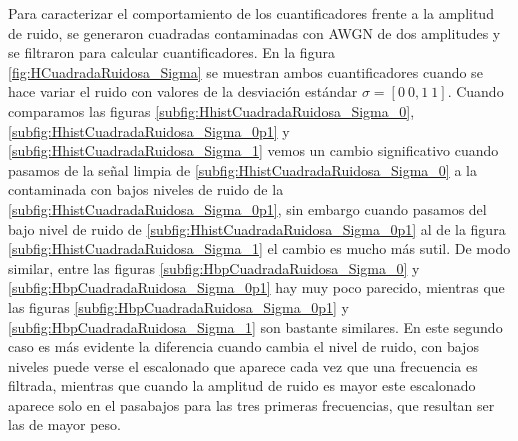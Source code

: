 Para caracterizar el comportamiento de los cuantificadores frente a la amplitud de ruido, se generaron cuadradas contaminadas con AWGN de dos amplitudes y se filtraron para calcular cuantificadores.
En la figura \ref{fig:HCuadradaRuidosa_Sigma} se muestran ambos cuantificadores cuando se hace variar el ruido con valores de la desviación estándar $\sigma=[0~0,1~1]$.
Cuando comparamos las figuras \ref{subfig:HhistCuadradaRuidosa_Sigma_0}, \ref{subfig:HhistCuadradaRuidosa_Sigma_0p1} y \ref{subfig:HhistCuadradaRuidosa_Sigma_1} vemos un cambio significativo cuando pasamos de la señal limpia de \ref{subfig:HhistCuadradaRuidosa_Sigma_0} a la contaminada con bajos niveles de ruido de la \ref{subfig:HhistCuadradaRuidosa_Sigma_0p1}, sin embargo cuando pasamos del bajo nivel de ruido de \ref{subfig:HhistCuadradaRuidosa_Sigma_0p1} al de la figura \ref{subfig:HhistCuadradaRuidosa_Sigma_1} el cambio es mucho más sutil.
De modo similar, entre las figuras \ref{subfig:HbpCuadradaRuidosa_Sigma_0} y \ref{subfig:HbpCuadradaRuidosa_Sigma_0p1} hay muy poco parecido, mientras que las figuras \ref{subfig:HbpCuadradaRuidosa_Sigma_0p1} y \ref{subfig:HbpCuadradaRuidosa_Sigma_1} son bastante similares.
En este segundo caso es más evidente la diferencia cuando cambia el nivel de ruido, con bajos niveles puede verse el escalonado que aparece cada vez que una frecuencia es filtrada, mientras que cuando la amplitud de ruido es mayor este escalonado aparece solo en el pasabajos para las tres primeras frecuencias, que resultan ser las de mayor peso.
%
